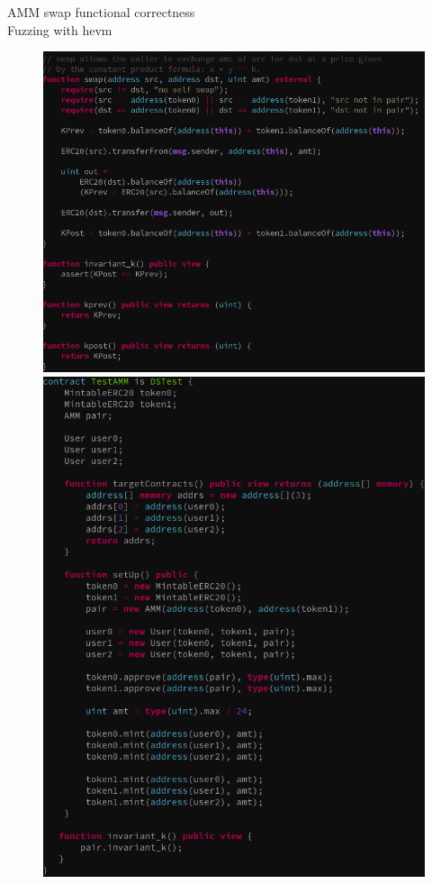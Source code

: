 \documentclass[aspectratio=169,10pt]{beamer}
\begin{document}
\begin{frame}[fragile]
\begin{center}
AMM swap functional correctness\\
Fuzzing with hevm
\begin{figure}
\includegraphics[scale=0.2]{images/amm_fail_hevm_code}
\includegraphics[scale=0.2]{images/amm_fail_hevm_code_test}
\end{figure}
\end{center}
\end{frame}
\end{document}
